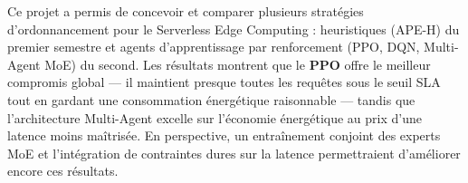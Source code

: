 Ce projet a permis de concevoir et comparer plusieurs stratégies d'ordonnancement pour le Serverless Edge Computing : heuristiques (APE-H) du premier semestre et agents d'apprentissage par renforcement (PPO, DQN, Multi-Agent MoE) du second. Les résultats montrent que le \textbf{PPO} offre le meilleur compromis global — il maintient presque toutes les requêtes sous le seuil SLA tout en gardant une consommation énergétique raisonnable — tandis que l'architecture Multi-Agent excelle sur l'économie énergétique au prix d'une latence moins maîtrisée. En perspective, un entraînement conjoint des experts MoE et l'intégration de contraintes dures sur la latence permettraient d'améliorer encore ces résultats.
